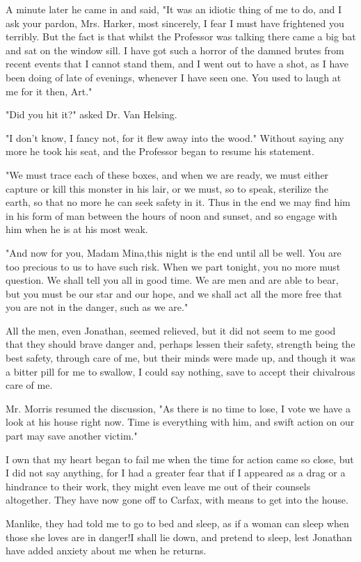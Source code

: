 A minute later he came in and said, "It was an idiotic thing of me to do, and I ask your pardon, Mrs. Harker, most sincerely, I fear I must have frightened you terribly. But the fact is that whilst the Professor was talking there came a big bat and sat on the window sill. I have got such a horror of the damned brutes from recent events that I cannot stand them, and I went out to have a shot, as I have been doing of late of evenings, whenever I have seen one. You used to laugh at me for it then, Art." 

"Did you hit it?" asked Dr. Van Helsing. 

"I don't know, I fancy not, for it flew away into the wood." Without saying any more he took his seat, and the Professor began to resume his statement. 

"We must trace each of these boxes, and when we are ready, we must either capture or kill this monster in his lair, or we must, so to speak, sterilize the earth, so that no more he can seek safety in it. Thus in the end we may find him in his form of man between the hours of noon and sunset, and so engage with him when he is at his most weak. 

"And now for you, Madam Mina,this night is the end until all be well. You are too precious to us to have such risk. When we part tonight, you no more must question. We shall tell you all in good time. We are men and are able to bear, but you must be our star and our hope, and we shall act all the more free that you are not in the danger, such as we are." 

All the men, even Jonathan, seemed relieved, but it did not seem to me good that they should brave danger and, perhaps lessen their safety, strength being the best safety, through care of me, but their minds were made up, and though it was a bitter pill for me to swallow, I could say nothing, save to accept their chivalrous care of me. 

Mr. Morris resumed the discussion, "As there is no time to lose, I vote we have a look at his house right now. Time is everything with him, and swift action on our part may save another victim." 

I own that my heart began to fail me when the time for action came so close, but I did not say anything, for I had a greater fear that if I appeared as a drag or a hindrance to their work, they might even leave me out of their counsels altogether. They have now gone off to Carfax, with means to get into the house. 

Manlike, they had told me to go to bed and sleep, as if a woman can sleep when those she loves are in danger!I shall lie down, and pretend to sleep, lest Jonathan have added anxiety about me when he returns. 

